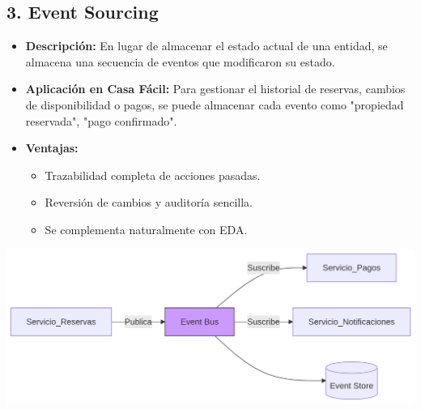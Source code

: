 	\subsection*{3. Event Sourcing}
		\begin{itemize}
			\item \textbf{Descripción:} En lugar de almacenar el estado actual de una entidad, se almacena una secuencia de eventos que modificaron su estado.  
			\item \textbf{Aplicación en Casa Fácil:} Para gestionar el historial de reservas, cambios de disponibilidad o pagos, se puede almacenar cada evento como "propiedad reservada", "pago confirmado".  
			\item 	\textbf{Ventajas:}
			\begin{itemize}
				\item Trazabilidad completa de acciones pasadas.
				\item Reversión de cambios y auditoría sencilla.
				\item Se complementa naturalmente con EDA.
			\end{itemize}
		\end{itemize}
		\begin{center}
			\includegraphics[width=\linewidth]{figures/patterns/EVENT.png}
			\label{fig:img4}
		\end{center}
		

